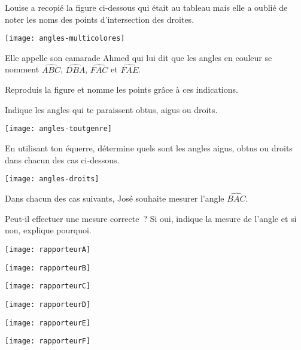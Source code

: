 \begin{exercice}
Louise a recopié la figure ci‑dessous qui était au tableau mais elle a oublié de noter les noms des points d'intersection des droites. 
 \begin{center} \texttt{[image: angles-multicolores]}  \end{center}
Elle appelle son camarade Ahmed qui lui dit que les angles en couleur se nomment $\widehat{ABC}$, $\widehat{DBA}$, $\widehat{FAC}$ et $\widehat{FAE}$.

Reproduis la figure et nomme les points grâce à ces indications.
\end{exercice}  





\begin{exercice}
Indique les angles qui te paraissent obtus, aigus ou droits.
 \begin{center} \texttt{[image: angles-toutgenre]}  \end{center}
\end{exercice}


\begin{exercice}
En utilisant ton équerre, détermine quels sont les angles aigus, obtus ou droits dans chacun des cas ci-dessous.
 \begin{center} \texttt{[image: angles-droits]}  \end{center}
\end{exercice}


\begin{exercice}
Dans chacun des cas suivants, José souhaite mesurer l'angle $\widehat{BAC}$.

Peut‑il effectuer une mesure correcte ? Si oui, indique la mesure de l'angle et si non, explique pourquoi. \\[0.5em]
\begin{colenumerate}{2}
 \item 
 
 \texttt{[image: rapporteurA]}
 \item 
 
  \vspace{-2em} \texttt{[image: rapporteurB]}
 \item 
 
 \texttt{[image: rapporteurC]}
 \item 
 
 \texttt{[image: rapporteurD]}
 \item 
 
 \texttt{[image: rapporteurE]}
 \item 
 
 \vspace{-2em} \texttt{[image: rapporteurF]}
 \end{colenumerate}
\end{exercice}  